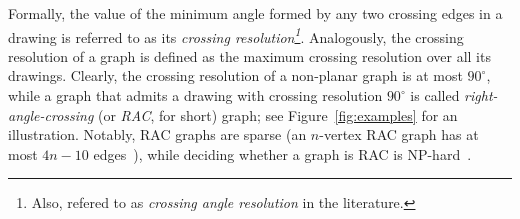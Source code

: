 \documentclass{comjnl}
\begin{document}
Formally, the value of the minimum angle formed by any two crossing edges in a drawing is referred to as its \emph{crossing resolution\footnote{Also, refered to as \emph{crossing angle resolution} in the literature.}}. Analogously, the crossing resolution of a graph is defined as the maximum crossing resolution over all its drawings. Clearly, the crossing resolution of a non-planar graph is at most $90^\circ$, while a graph that admits a drawing with crossing resolution $90^\circ$ is called \emph{right-angle-crossing} (or \emph{RAC}, for short) graph; see Figure~\ref{fig:examples} for an illustration. Notably, RAC graphs are sparse (an $n$-vertex RAC graph has at most $4n-10$ edges~\cite{DBLP:journals/tcs/DidimoEL11}), while deciding whether a graph is RAC is NP-hard~\cite{DBLP:journals/jgaa/ArgyriouBS12}.

\begin{figure}[t!]
	\centering

\end{figure}
\end{document}
